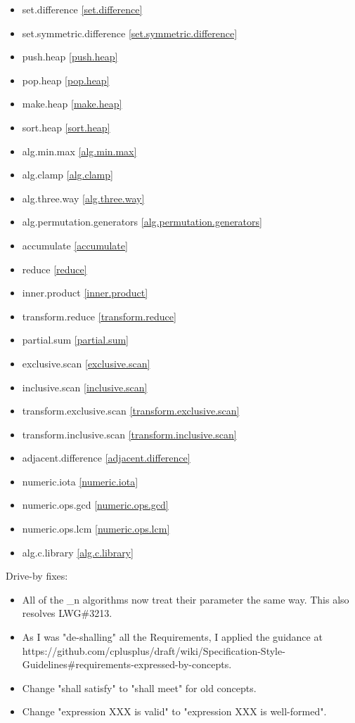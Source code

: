\begin{multicols}{3}
\begin{itemize}
\item{set.difference}				\ref{set.difference}
\item{set.symmetric.difference}		\ref{set.symmetric.difference}
\item{push.heap}					\ref{push.heap}
\item{pop.heap}						\ref{pop.heap}
\item{make.heap}					\ref{make.heap}
\item{sort.heap}					\ref{sort.heap}
\item{alg.min.max}					\ref{alg.min.max}
\item{alg.clamp}					\ref{alg.clamp}
\item{alg.three.way}				\ref{alg.three.way}
\item{alg.permutation.generators}	\ref{alg.permutation.generators}
\item{accumulate}					\ref{accumulate}
\item{reduce}						\ref{reduce}
\item{inner.product}				\ref{inner.product}
\item{transform.reduce}				\ref{transform.reduce}
\item{partial.sum}					\ref{partial.sum}
\item{exclusive.scan}				\ref{exclusive.scan}
\item{inclusive.scan}				\ref{inclusive.scan}
\item{transform.exclusive.scan}		\ref{transform.exclusive.scan}
\item{transform.inclusive.scan}		\ref{transform.inclusive.scan}
\item{adjacent.difference}			\ref{adjacent.difference}
\item{numeric.iota}					\ref{numeric.iota}
\item{numeric.ops.gcd}				\ref{numeric.ops.gcd}
\item{numeric.ops.lcm}				\ref{numeric.ops.lcm}
\item{alg.c.library}				\ref{alg.c.library}
\end{itemize}
\end{multicols}

Drive-by fixes:
\begin{itemize}
\item{All of the \*_n algorithms now treat their  parameter the same way. This also resolves LWG\#3213.}
\item{As I was "de-shalling" all the Requirements, I applied the guidance at https://github.com/cplusplus/draft/wiki/Specification-Style-Guidelines\#requirements-expressed-by-concepts.}
\item{Change "shall satisfy" to "shall meet" for old concepts.}
\item{Change "expression XXX is valid" to "expression XXX is well-formed".}
\end{itemize}

